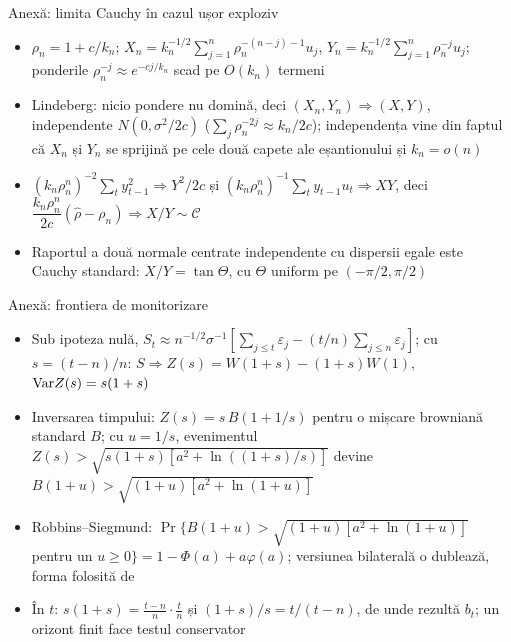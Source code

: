 \begin{frame}{Anexă: limita Cauchy în cazul ușor exploziv}
\hypertarget{atsapp1}{}
\itemsize{\small}
\begin{itemize}
    \item $\rho_n = 1 + c/k_n$; $X_n = k_n^{-1/2}\sum_{j=1}^{n}\rho_n^{-(n-j)-1}u_j$, $Y_n = k_n^{-1/2}\sum_{j=1}^{n}\rho_n^{-j}u_j$; ponderile $\rho_n^{-j} \approx e^{-cj/k_n}$ scad pe $O(k_n)$ termeni
    \item Lindeberg: nicio pondere nu domină, deci $(X_n, Y_n) \Rightarrow (X, Y)$, independente $N(0, \sigma^2/2c)$ ($\sum_j\rho_n^{-2j} \approx k_n/2c$); independența vine din faptul că $X_n$ și $Y_n$ se sprijină pe cele două capete ale eșantionului și $k_n = o(n)$
    \item $(k_n\rho_n^n)^{-2}\sum_t y_{t-1}^2 \Rightarrow Y^2/2c$ și $(k_n\rho_n^n)^{-1}\sum_t y_{t-1}u_t \Rightarrow XY$, deci $\dfrac{k_n\rho_n^n}{2c}(\hat\rho - \rho_n) \Rightarrow X/Y \sim \mathcal C$ 
    \item Raportul a două normale centrate independente cu dispersii egale este Cauchy standard: $X/Y = \tan\Theta$, cu $\Theta$ uniform pe $(-\pi/2, \pi/2)$
\end{itemize}
\end{frame}

\begin{frame}{Anexă: frontiera de monitorizare}
\hypertarget{atsapp2}{}
\itemsize{\small}
\begin{itemize}
    \item Sub ipoteza nulă, $S_t \approx n^{-1/2}\sigma^{-1}[\sum_{j \le t}\varepsilon_j - (t/n)\sum_{j \le n}\varepsilon_j]$; cu $s = (t - n)/n$: $S \Rightarrow Z(s) = W(1 + s) - (1 + s)W(1)$, $\text{Var} Z(s) = s(1 + s)$
    \item Inversarea timpului: $Z(s) = s\,B(1 + 1/s)$ pentru o mișcare browniană standard $B$; cu $u = 1/s$, evenimentul $Z(s) > \sqrt{s(1 + s)[a^2 + \ln((1 + s)/s)]}$ devine $B(1 + u) > \sqrt{(1 + u)[a^2 + \ln(1 + u)]}$
    \item Robbins--Siegmund: $\Pr\{B(1 + u) > \sqrt{(1 + u)[a^2 + \ln(1 + u)]}$ pentru un $u \ge 0\} = 1 - \Phi(a) + a\varphi(a)$; versiunea bilaterală o dublează, forma folosită de 
    \item În $t$: $s(1 + s) = \frac{t - n}{n}\cdot\frac{t}{n}$ și $(1 + s)/s = t/(t - n)$, de unde rezultă $b_t$; un orizont finit face testul conservator
\end{itemize}
\end{frame}


